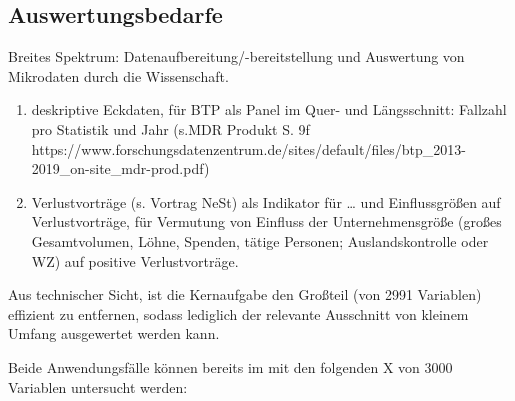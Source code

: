 \documentclass[
  german,
  10pt,
  twoside]{article}
\begin{document}
\subsection{Auswertungsbedarfe}\label{auswertungsbedarfe}

Breites Spektrum: Datenaufbereitung/-bereitstellung und Auswertung von
Mikrodaten durch die Wissenschaft.

\begin{enumerate}
\def\labelenumi{\arabic{enumi}.}
\item
  deskriptive Eckdaten, für BTP als Panel im Quer- und Längsschnitt:
  Fallzahl pro Statistik und Jahr (s.MDR Produkt S. 9f
  https://www.forschungsdatenzentrum.de/sites/default/files/btp\_2013-2019\_on-site\_mdr-prod.pdf)
\item
  Verlustvorträge (s. Vortrag NeSt) als Indikator für \ldots{} und
  Einflussgrößen auf Verlustvorträge, für Vermutung von Einfluss der
  Unternehmensgröße (großes Gesamtvolumen, Löhne, Spenden, tätige
  Personen; Auslandskontrolle oder WZ) auf positive Verlustvorträge.
\end{enumerate}

Aus technischer Sicht, ist die Kernaufgabe den Großteil (von 2991
Variablen) effizient zu entfernen, sodass lediglich der relevante
Ausschnitt von kleinem Umfang ausgewertet werden kann.

Beide Anwendungsfälle können bereits im mit den folgenden X von 3000
Variablen untersucht werden:
\end{document}
